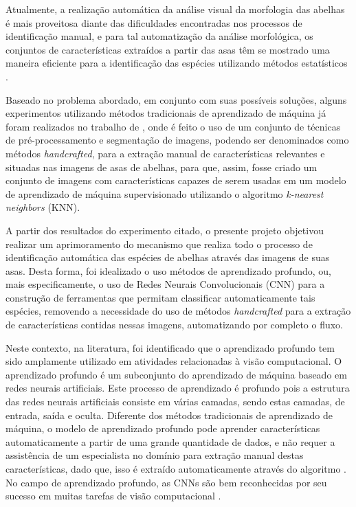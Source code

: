 \documentclass[
	12pt,				%
	oneside,			%
	a4paper,			%
	english,			%
	brazil				%
	]{abntex2ppgsi}
\begin{document}
Atualmente, a realização automática da análise visual da morfologia das abelhas é mais proveitosa diante das dificuldades encontradas nos processos de identificação manual, e para tal automatização da análise morfológica, os conjuntos de características extraídos a partir das asas têm se mostrado uma maneira eficiente para a identificação das espécies utilizando métodos estatísticos \cite{francoy2008identification}.

Baseado no problema abordado, em conjunto com suas possíveis soluções, alguns experimentos utilizando métodos tradicionais de aprendizado de máquina já foram realizados no trabalho de , onde é feito o uso de um conjunto de técnicas de pré-processamento e segmentação de imagens, podendo ser denominados como métodos \textit{handcrafted}, para a extração manual de características relevantes e situadas nas imagens de asas de abelhas, para que, assim, fosse criado um conjunto de imagens com características capazes de serem usadas em um modelo de aprendizado de máquina supervisionado utilizando o algoritmo \textit{k-nearest neighbors} (KNN).

A partir dos resultados do experimento citado, o presente projeto objetivou realizar um aprimoramento do mecanismo que realiza todo o processo de identificação automática das espécies de abelhas através das imagens de suas asas. Desta forma, foi idealizado o uso métodos de aprendizado profundo, ou, mais especificamente, o uso de Redes Neurais Convolucionais (CNN) para a construção de ferramentas que permitam classificar automaticamente tais espécies, removendo a necessidade do uso de métodos \textit{handcrafted} para a extração de características contidas nessas imagens, automatizando por completo o fluxo.

Neste contexto, na literatura, foi identificado que o aprendizado profundo tem sido amplamente utilizado em atividades relacionadas à visão computacional. O aprendizado profundo é um subconjunto do aprendizado de máquina baseado em redes neurais artificiais. Este processo de aprendizado é profundo pois a estrutura das redes neurais artificiais consiste em várias camadas, sendo estas camadas, de entrada, saída e oculta. Diferente dos métodos tradicionais de aprendizado de máquina, o modelo de aprendizado profundo pode aprender características automaticamente a partir de uma grande quantidade de dados, e não requer a assistência de um especialista no domínio para extração manual destas características, dado que, isso é extraído automaticamente através do algoritmo \cite{liu2020classification}. No campo de aprendizado profundo, as CNNs são bem reconhecidas por seu sucesso em muitas tarefas de visão computacional \cite{le2020automated}.
\end{document}
